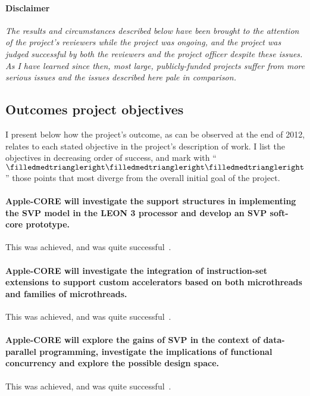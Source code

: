 \paragraph{Disclaimer}
{\itshape The results and circumstances described below have been
brought to the attention of the project's reviewers while
the project was ongoing, and the project was judged successful
by both the reviewers and the project officer \emph{despite} these
issues. As I have learned since then, most
large, publicly-funded projects suffer from more serious issues and
the issues described here pale in comparison.}

\subsection{Outcomes \vs project objectives}

I present below how the project's outcome, as can be observed at the
end of 2012, relates to each stated objective in the project's
description of work. I list the objectives in decreasing order of
success, and mark with ``$\filledmedtriangleright\filledmedtriangleright\filledmedtriangleright$'' those
points that most diverge from the overall initial goal of the project.

\paragraph{Apple-CORE will investigate the support structures in 
implementing the SVP model in the LEON 3 processor and develop an SVP soft-core prototype.}
This was achieved, and was quite successful~\cite{danek.10.ddecs,sykora.11.lncs,danek.12}.

\paragraph{Apple-CORE will investigate the integration of instruction-set extensions to support custom accelerators based on both microthreads and families of microthreads.}
This was achieved, and was quite successful~\cite{danek.12}.

\paragraph{Apple-CORE will explore the gains of SVP in the context of data-parallel 
programming, investigate the implications of functional concurrency and explore the possible design space.}
This was achieved, and was quite successful~\cite{a-c-d44}.

